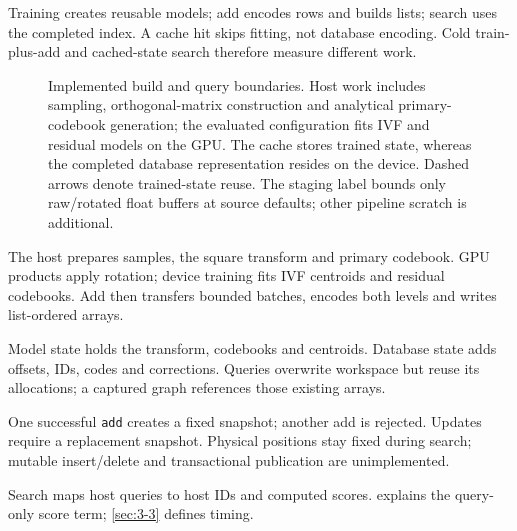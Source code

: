 Training creates reusable models; add encodes rows and builds lists; search uses the completed index. A cache hit skips fitting, not database encoding. Cold train-plus-add and cached-state search therefore measure different work.

\begin{figure}[tbp]
\centering

\caption[Build and query architecture]{Implemented build and query boundaries. Host work includes
sampling, orthogonal-matrix construction and analytical primary-codebook
generation; the evaluated configuration fits IVF and residual models on
the GPU. The cache stores trained state, whereas the completed database
representation resides on the device. Dashed arrows denote trained-state
reuse. The staging label bounds only raw/rotated float buffers at source
defaults; other pipeline scratch is additional.}
\label{fig:4-architecture}
\end{figure}

The host prepares samples, the square transform and primary codebook. GPU products apply rotation; device training fits IVF centroids and residual codebooks. Add then transfers bounded batches, encodes both levels and writes list-ordered arrays.

Model state holds the transform, codebooks and centroids. Database state adds offsets, IDs, codes and corrections. Queries overwrite workspace but reuse its allocations; a captured graph references those existing arrays.

One successful \texttt{add} creates a fixed snapshot; another add is rejected. Updates require a replacement snapshot. Physical positions stay fixed during search; mutable insert/delete and transactional publication are unimplemented.

Search maps host queries to host IDs and computed scores.  explains the query-only score term; \cref{sec:3-3} defines timing.

